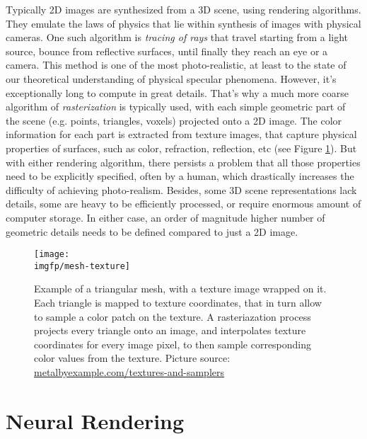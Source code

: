 Typically 2D images are synthesized from a 3D scene, using rendering algorithms. They emulate the laws of physics that lie within synthesis of images with physical cameras. One such algorithm is \textit{tracing of rays} that travel starting from a light source, bounce from reflective surfaces, until finally they reach an eye or a camera. This method is one of the most photo-realistic, at least to the state of our theoretical understanding of physical specular phenomena. However, it's exceptionally long to compute in great details. That's why a much more coarse algorithm of \textit{rasterization} is typically used, with each simple geometric part of the scene (e.g. points, triangles, voxels) projected onto a 2D image. The color information for each part is extracted from texture images, that capture physical properties of surfaces, such as color, refraction, reflection, etc (see Figure \ref{intro:fig:mesh-texture}). But with either rendering algorithm, there persists a problem that all those properties need to be explicitly specified, often by a human, which drastically increases the difficulty of achieving photo-realism. Besides, some 3D scene representations lack details, some are heavy to be efficiently processed, or require enormous amount of computer storage. In either case, an order of magnitude higher number of geometric details needs to be defined compared to just a 2D image. 

\begin{figure}[h!]
	\centering
	\texttt{[image: \\imgfp/mesh-texture]}
	\caption{Example of a triangular mesh, with a texture image wrapped on it. Each triangle is mapped to texture coordinates, that in turn allow to sample a color patch on the texture. A rasteriazation process projects every triangle onto an image, and interpolates texture coordinates for every image pixel, to then sample corresponding color values from the texture. Picture source: \href{https://metalbyexample.com/textures-and-samplers/}{metalbyexample.com/textures-and-samplers}}
	\label{intro:fig:mesh-texture}
\end{figure}


\section{Neural Rendering}\label{intro:nrender}

